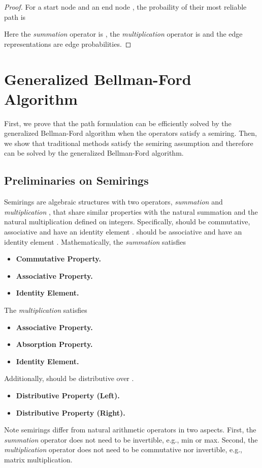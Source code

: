 \reliable*
\begin{proof}
For a start node  and an end node , the probaility of their most reliable path is 

Here the \emph{summation} operator is , the \emph{multiplication} operator is  and the edge representations are edge probabilities.
\end{proof}

\section{Generalized Bellman-Ford Algorithm}
\label{app:bellman_ford}

First, we prove that the path formulation can be efficiently solved by the generalized Bellman-Ford algorithm when the operators  satisfy a semiring.
Then, we show that traditional methods satisfy the semiring assumption and therefore can be solved by the generalized Bellman-Ford algorithm.

\subsection{Preliminaries on Semirings}

Semirings are algebraic structures with two operators, \emph{summation}  and \emph{multiplication} , that share similar properties with the natural summation and the natural multiplication defined on integers. Specifically,  should be commutative, associative and have an identity element .  should be associative and have an identity element . Mathematically, the \emph{summation}  satisfies
\begin{itemize}
    \setlength{\parskip}{0pt}
    \setlength{\itemsep}{0pt plus 1pt}
    \item \textbf{Commutative Property.} 
    \item \textbf{Associative Property.} 
    \item \textbf{Identity Element.} 
\end{itemize}
The \emph{multiplication}  satisfies
\begin{itemize}
    \setlength{\parskip}{0pt}
    \setlength{\itemsep}{0pt plus 1pt}
    \item \textbf{Associative Property.} 
    \item \textbf{Absorption Property.} 
    \item \textbf{Identity Element.} 
\end{itemize}
Additionally,  should be distributive over .
\begin{itemize}
    \setlength{\parskip}{0pt}
    \setlength{\itemsep}{0pt plus 1pt}
    \item \textbf{Distributive Property (Left).} 
    \item \textbf{Distributive Property (Right).} 
\end{itemize}
Note semirings differ from natural arithmetic operators in two aspects. First, the \emph{summation} operator  does not need to be invertible, e.g., min or max. Second, the \emph{multiplication} operator  does not need to be commutative nor invertible, e.g., matrix multiplication.

